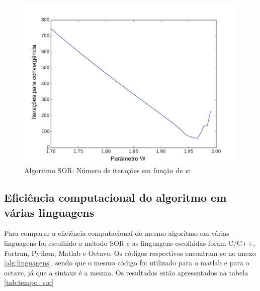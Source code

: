 \begin{figure}[H]
\centering
\includegraphics[width=\textwidth]{Figuras/parametro_sor}
\caption{Algoritmo SOR: Número de iterações em função de $w$}
\label{fig:parametro_sor}
\end{figure}

\subsection{Eficiência computacional do algoritmo em várias linguagens}

Para comparar a eficiência computacional do mesmo algoritmo em várias linguagens foi escolhido o método SOR e as linguagens escolhidas foram C/C++, Fortran, Python, Matlab e Octave. Os códigos respectivos encontram-se no anexo \ref{alg:linguagens}, sendo que o mesmo código foi utilizado para o matlab e para o octave, já que a sintaxe é a mesma. Os resultados estão apresentados na tabela \ref{tab:tempo_sor}

